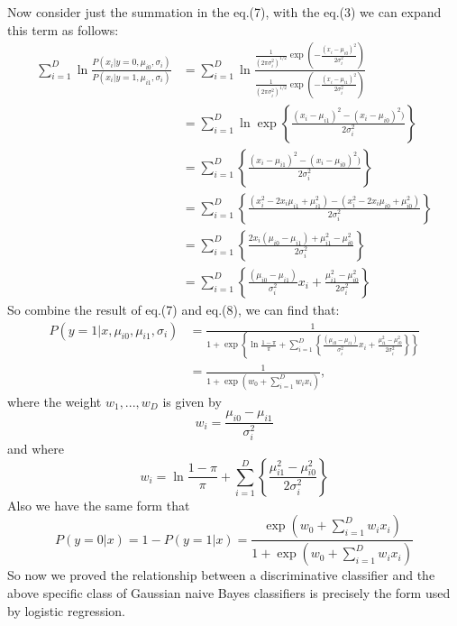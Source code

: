 \documentclass[UTF8,12pt, a4paper]{ctexart}
\begin{document}
\begin{tcolorbox}
\begin{equation}
\end{equation}
Now consider just the summation in the eq.(7), with the eq.(3) we can expand this term as follows:\\
\begin{equation}
  \begin{aligned}
    \sum_{i=1}^{D}\ln \frac{P(x_i|y=0,\mu_{i0}, \sigma_i)}{P(x_i|y=1,\mu_{i1}, \sigma_i)}
    &=\sum_{i=1}^{D}\ln \frac{
        \frac{1}{(2\pi\sigma_i ^2)^{1/2}} \exp\left(-\frac{(x_i-\mu_{i0})^2}{2\sigma_i^2}\right)
      }{
        \frac{1}{(2\pi\sigma_i ^2)^{1/2}} \exp\left(-\frac{(x_i-\mu_{i1})^2}{2\sigma_i^2}\right)
      } \\
      &=\sum_{i=1}^{D}\ln \exp \left\{
        \frac{
        (x_i-\mu_{i1})^2-(x_i-\mu_{i0})^2)
      }{
        2\sigma_i ^2
      }\right\} \\
      &=\sum_{i=1}^{D}\left\{
        \frac{
        (x_i-\mu_{i1})^2-(x_i-\mu_{i0})^2)
      }{
        2\sigma_i ^2
      }\right\} \\
      &=\sum_{i=1}^{D}\left\{
        \frac{
        (x_i^2 -2x_i\mu_{i1} + \mu_{i1}^{2})-(x_i^2 -2x_i\mu_{i0} + \mu_{i0}^{2})
      }{
        2\sigma_i ^2
      }\right\} \\
      &=\sum_{i=1}^{D}\left\{
        \frac{
        2x_i(\mu_{i0}-\mu_{i1}) + \mu_{i1}^{2} - \mu_{i0}^{2}
      }{
        2\sigma_i ^2
      }\right\} \\
      &=\sum_{i=1}^{D}\left\{
        \frac{(\mu_{i0}-\mu_{i1})}{\sigma_i ^2}x_i
        +\frac{ \mu_{i1}^{2} - \mu_{i0}^{2}}{2\sigma_i ^2}\right\}
  \end{aligned}
\end{equation}
So combine the result of eq.(7) and eq.(8), we can find that:
\begin{equation}
  \begin{aligned}
    P(y=1|x, \mu_{i0}, \mu_{i1}, \sigma_i)
    &=\frac{1}{1+\exp\left\{ \ln\frac{1-\pi}{\pi} + 
      \sum_{i=1}^{D}\left\{
      \frac{(\mu_{i0}-\mu_{i1})}{\sigma_i ^2}x_i
      +\frac{ \mu_{i1}^{2} - \mu_{i0}^{2}}{2\sigma_i ^2}\right\}  
      \right\}} \\
    &=\frac{1}{1+\exp(w_0 + \sum_{i=1}^{D}{w_ix_i})},
  \end{aligned}
\end{equation}
where the weight $w_1,...,w_D$ is given by
$$
w_i=\frac{\mu_{i0}-\mu_{i1}}{\sigma_i^2}
$$
and where
$$
w_i=\ln\frac{1-\pi}{\pi} 
  + \sum_{i=1}^{D}\left\{
   \frac{ \mu_{i1}^{2} - \mu_{i0}^{2}}{2\sigma_i ^2}
  \right\}
$$
Also we have the same form that
$$
P(y=0|x)=1-P(y=1|x) = \frac{\exp\left(w_0 + \sum_{i=1}^{D}{w_ix_i}\right)}{1+\exp\left(w_0 + \sum_{i=1}^{D}{w_ix_i}\right)}
$$
{\color{red}
So now we proved the relationship between a discriminative classifier and the above specific class of Gaussian naive Bayes classifiers is precisely the form used by logistic regression.\\
} 
\end{tcolorbox}
\end{document}
